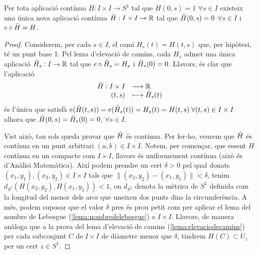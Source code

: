 \documentclass[../main.tex]{subfiles}
\begin{document}
\begin{lema}
\label{lema:elevaciohomotopies} Per tota aplicació contínua $H:I\times I\rightarrow S^1$ tal que $H(0,s)=1$ $\forall s\in I$ existeix una única nova aplicació contínua $\Tilde{H}:I\times I\rightarrow\mathbb{R}$ tal que $\Tilde{H}(0,s)=0$ $\forall s\in I$ i $e\circ \Tilde{H} = H$.
\end{lema}
\begin{proof}
Considerem, per cada $s\in I$, el camí $H_s(t) = H(t,s)$ que, per hipòtesi, té un punt base 1. Pel lema d'elevació de camins, cada $H_s$ admet una única aplicació $\Tilde{H}_s:I\rightarrow \mathbb{R}$ tal que $e\circ\Tilde{H}_s= H_s$ i $\Tilde{H}_s(0) = 0$. Llavors, és clar que l'aplicació
\begin{equation}
    \notag
    \begin{array}{rl}
        \Tilde{H}:I\times I & \longrightarrow\mathbb{R} \\
        (t,s) & \longmapsto\Tilde{H}_s(t)
    \end{array}
\end{equation}
és l'única que satisfà $e(\Tilde{H}(t,s)) = e(\Tilde{H}_s(t)) = H_s(t)=H(t,s)\;\forall (t,s)\in I\times I$ alhora que $\Tilde{H}(0,s) = \Tilde{H}_s(0) = 0$, $\forall s\in I$.

Vist això, tan sols queda provar que $\Tilde{H}$ és contínua. Per fer-ho, veurem que $\Tilde{H}$ és contínua en un punt arbitrari $(a,b)\in I\times I$. Notem, per començar, que essent $H$ contínua en un compacte com $I\times I$, llavors és uniformement contínua (això és d'Anàlisi Matemàtica). Així podem prendre un cert $\delta >0$ pel qual donats $(x_1,y_1),(x_2,y_2)\in I\times I$ tals que $\|(x_2,y_2)-(x_1,y_1)\|<\delta$, tenim $d_{S^1}(H(x_2,y_2),H(x_1,y_1))<1$, on $d_{S^1}$ denota la mètrica de $S^1$ definida com la longitud del menor dels arcs que uneixen dos punts dins la circumferència. A més, podem suposar que el valor $\delta$ pres és prou petit com per aplicar el lema del nombre de Lebesgue (\ref{lema:nombredelebesgue}) a $I\times I$. Llavors, de manera anàloga que a la prova del lema d'elevació de camins (\ref{lema:elevaciodecamins}) per cada subconjunt $C$ de $I\times I$ de diàmetre menor que $\delta$, tindrem $H(C)\subset U_z$ per un cert $z\in S^1$.


\end{proof}
\end{document}
